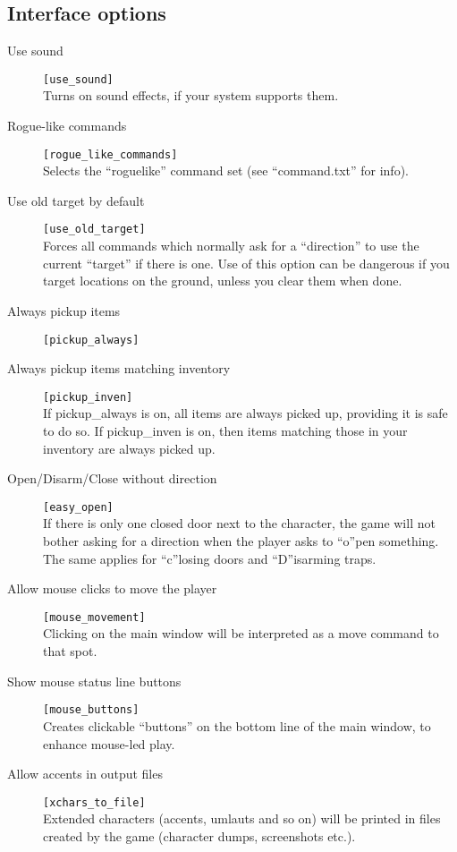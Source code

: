 \subsection{Interface options}
\begin{description}
\item[Use sound] \verb+[use_sound]+\\
    Turns on sound effects, if your system supports them.

\item[Rogue-like commands] \verb+[rogue_like_commands]+\\
    Selects the ``roguelike'' command set (see ``command.txt'' for info).

\item[Use old target by default] \verb+[use_old_target]+\\
    Forces all commands which normally ask for a ``direction'' to use the
    current ``target'' if there is one. Use of this option can be dangerous
    if you target locations on the ground, unless you clear them when done.

\item[Always pickup items] \verb+[pickup_always]+\\
\item[Always pickup items matching inventory] \verb+[pickup_inven]+\\
If pickup\_always is on, all items are always picked up, providing it is
safe to do so. If pickup\_inven is on, then items matching those in your
inventory are always picked up.

\item[Open/Disarm/Close without direction] \verb+[easy_open]+\\
    If there is only one closed door next to the character, the game will
    not bother asking for a direction when the player asks to ``o''pen
    something. The same applies for ``c''losing doors and ``D''isarming traps.

\item[Allow mouse clicks to move the player] \verb+[mouse_movement]+\\
    Clicking on the main window will be interpreted as a move command to
    that spot.

\item[Show mouse status line buttons] \verb+[mouse_buttons]+\\
    Creates clickable ``buttons'' on the bottom line of the main window, to
    enhance mouse-led play.

\item[Allow accents in output files] \verb+[xchars_to_file]+\\
    Extended characters (accents, umlauts and so on) will be printed in
    files created by the game (character dumps, screenshots etc.).
\end{description}

